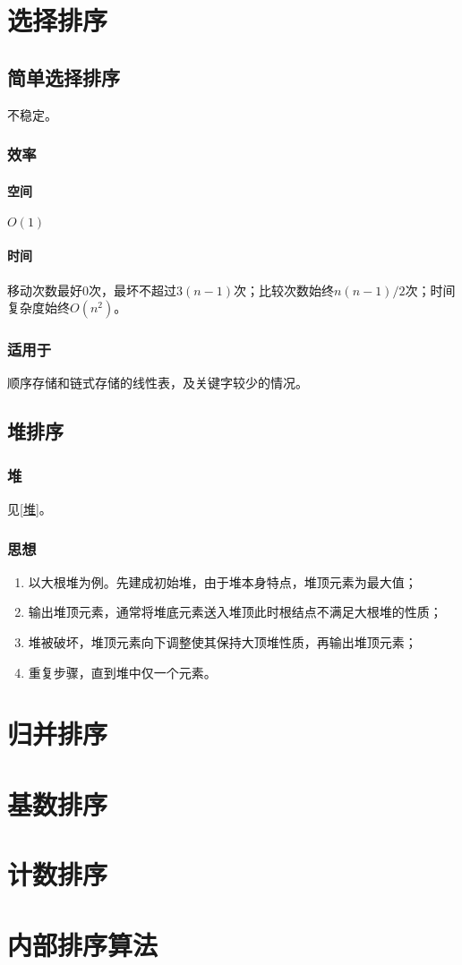 \section{选择排序}

\subsection{简单选择排序}
不稳定。

\subsubsection{效率}

\paragraph{空间}
\(O(1)\)

\paragraph{时间}
移动次数最好0次，最坏不超过\(3(n - 1)\)次；比较次数始终\(n(n - 1) / 2\)次；时间复杂度始终\(O(n^2)\)。


\subsubsection{适用于}
顺序存储和链式存储的线性表，及关键字较少的情况。


\subsection{堆排序}

\subsubsection{堆}
见\ref{堆}。

\subsubsection{思想}
\begin{enumerate}
    \item 以大根堆为例。先建成初始堆，由于堆本身特点，堆顶元素为最大值；
    \item 输出堆顶元素，通常将堆底元素送入堆顶此时根结点不满足大根堆的性质；
    \item 堆被破坏，堆顶元素向下调整使其保持大顶堆性质，再输出堆顶元素；
    \item 重复步骤，直到堆中仅一个元素。
\end{enumerate}


\section{归并排序}


\section{基数排序}


\section{计数排序}


\section{内部排序算法}




